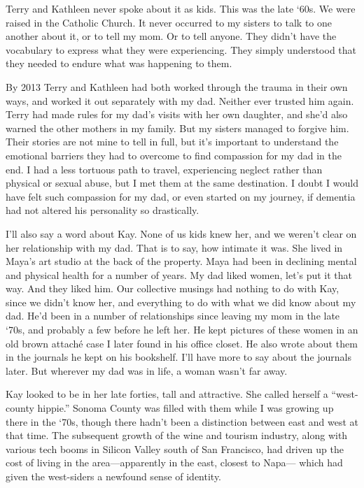 \documentclass[12pt]{book}
\begin{document}
Terry and Kathleen never spoke about it as kids. This was the late `60s. We were raised in the Catholic Church. It never occurred to my sisters to talk to one another about it, or to tell my mom. Or to tell anyone. They didn't have the vocabulary to express what they were experiencing. They simply understood that they needed to endure what was happening to them.

By 2013 Terry and Kathleen had both worked through the trauma in their own ways, and worked it out separately with my dad. Neither ever trusted him again. Terry had made rules for my dad's visits with her own daughter, and she'd also warned the other mothers in my family. But my sisters managed to forgive him. Their stories are not mine to tell in full, but it's important to understand the emotional barriers they had to overcome to find compassion for my dad in the end. I had a less tortuous path to travel, experiencing neglect rather than physical or sexual abuse, but I met them at the same destination. I doubt I would have felt such compassion for my dad, or even started on my journey, if dementia had not altered his personality so drastically.

I'll also say a word about Kay. None of us kids knew her, and we weren't clear on her relationship with my dad. That is to say, how intimate it was. She lived in Maya's art studio at the back of the property. Maya had been in declining mental and physical health for a number of years. My dad liked women, let's put it that way. And they liked him. Our collective musings had nothing to do with Kay, since we didn't know her, and everything to do with what we did know about my dad. He'd been in a number of relationships since leaving my mom in the late `70s, and probably a few before he left her. He kept pictures of these women in an old brown attach\'e case I later found in his office closet. He also wrote about them in the journals he kept on his bookshelf. I'll have more to say about the journals later. But wherever my dad was in life, a woman wasn't far away.

Kay looked to be in her late forties, tall and attractive. She called herself a ``west-county hippie.'' Sonoma County was filled with them while I was growing up there in the `70s, though there hadn't been a distinction between east and west at that time. The subsequent growth of the wine and tourism industry, along with various tech booms in Silicon Valley south of San Francisco, had driven up the cost of living in the area---apparently in the east, closest to Napa--- which had given the west-siders a newfound sense of identity.
\end{document}
